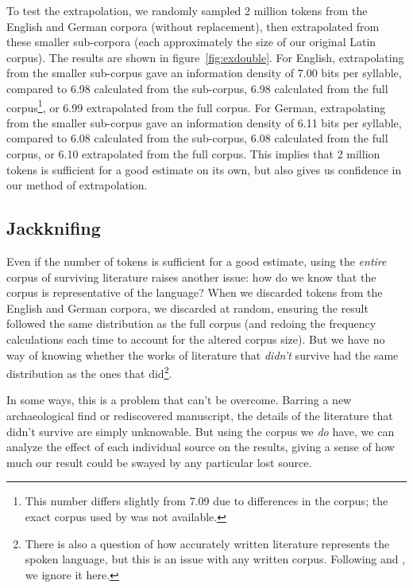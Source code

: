 \documentclass[12pt,twoside]{article}
\begin{document}
To test the extrapolation, we randomly sampled 2 million tokens from the English and German corpora (without replacement), then extrapolated from these smaller sub-corpora (each approximately the size of our original Latin corpus). The results are shown in figure~\ref{fig:exdouble}. For English, extrapolating from the smaller sub-corpus gave an information density of 7.00 bits per syllable, compared to 6.98 calculated from the sub-corpus, 6.98 calculated from the full corpus\footnote{This number differs slightly from  7.09 due to differences in the corpus; the exact corpus used by \citeauthor{oh} was not available.}, or 6.99 extrapolated from the full corpus. For German, extrapolating from the smaller sub-corpus gave an information density of 6.11 bits per syllable, compared to 6.08 calculated from the sub-corpus, 6.08 calculated from the full corpus, or 6.10 extrapolated from the full corpus. This implies that 2 million tokens is sufficient for a good estimate on its own, but also gives us confidence in our method of extrapolation.

\subsection{Jackknifing}

Even if the number of tokens is sufficient for a good estimate, using the \emph{entire} corpus of surviving literature raises another issue: how do we know that the corpus is representative of the language? When we discarded tokens from the English and German corpora, we discarded at random, ensuring the result followed the same distribution as the full corpus (and redoing the frequency calculations each time to account for the altered corpus size). But we have no way of knowing whether the works of literature that \emph{didn't} survive had the same distribution as the ones that did\footnote{There is also a question of how accurately written literature represents the spoken language, but this is an issue with any written corpus. Following \citereset\citet{oh} and \citet{coupé}, we ignore it here.}.

In some ways, this is a problem that can't be overcome. Barring a new archaeological find or rediscovered manuscript, the details of the literature that didn't survive are simply unknowable. But using the corpus we \emph{do} have, we can analyze the effect of each individual source on the results, giving a sense of how much our result could be swayed by any particular lost source.
\end{document}
